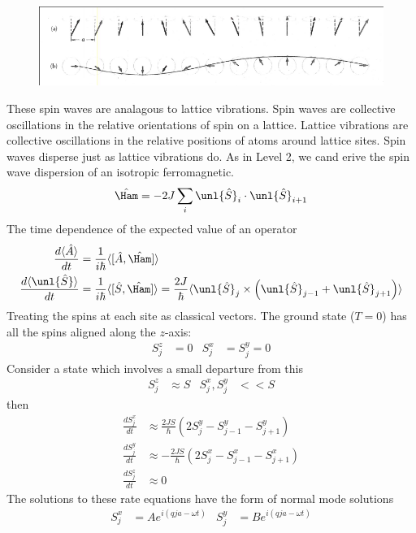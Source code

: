 \documentclass[a4paper, 11pt, normalem]{report}
\begin{document}
\begin{figure}[H]
    \centering
    \includegraphics[scale=0.5]{precess.png}
\end{figure}
These spin waves are analagous to lattice vibrations. 
Spin waves are collective oscillations in the relative orientations of spin on a lattice. 
Lattice vibrations are collective oscillations in the relative positions of atoms around lattice sites. 
Spin waves disperse just as lattice vibrations do. 
As in Level 2, we cand erive the spin wave dispersion of an isotropic ferromagnetic. 
\begin{equation}
    \hat{\Ham} = -2J\sum_i \unl{\hat{S}}_i\cdot\unl{\hat{S}}_{i+1}
\end{equation}
The time dependence of the expected value of an operator
\begin{align}
    \frac{d\langle \hat{A}\rangle}{dt} &= \frac{1}{i\hbar}\langle[\hat{A},\hat{\Ham}]\rangle \\
    \frac{d\langle\unl{\hat{S}}\rangle}{dt} &= \frac{1}{i\hbar}\langle[\hat{S},\hat{\Ham}]\rangle = \frac{2J}{\hbar}\langle \unl{\hat{S}}_j\times\left(\unl{\hat{S}}_{j-1} + \unl{\hat{S}}_{j+1}\right)\rangle
\end{align}
Treating the spins at each site as classical vectors. 
The ground state ($T=0$) has all the spins aligned along the $z$-axis:
\begin{align}
    S_j^z &= 0 & S_j^x &= S_j^y = 0
\end{align}
Consider a state which involves a small departure from this
\begin{align}
    S_j^z &\approx S & S_j^x,S_j^y &<< S
\end{align}
then 
\begin{align}
    \frac{dS_j^x}{dt} &\approx \frac{2JS}{\hbar}(2S_j^y - S_{j-1}^y - S_{j+1}^y) \\
    \frac{dS_j^y}{dt} &\approx -\frac{2JS}{\hbar}(2S_j^x - S_{j-1}^x - S_{j+1}^x) \\
    \frac{dS_j^z}{dt} &\approx 0
\end{align}
The solutions to these rate equations have the form of normal mode solutions
\begin{align}
    S_j^x &= Ae^{i(qja-\omega t)} & S_j^y &= Be^{i(qja-\omega t)}
\end{align}
\end{document}
